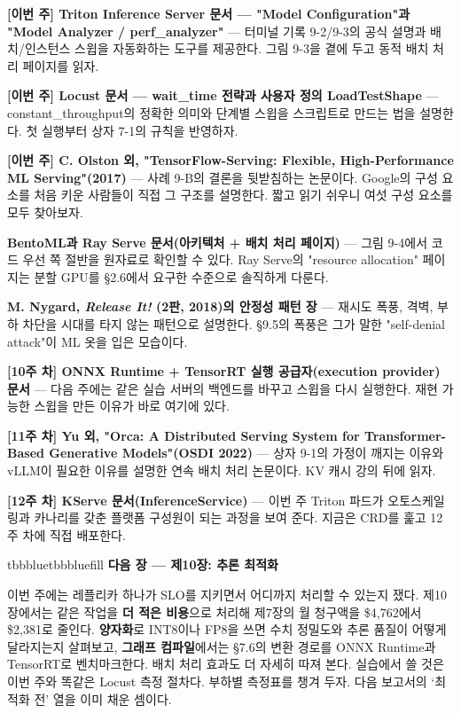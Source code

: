 \begin{tbbitemize}
  \item \textbf{[이번 주] Triton Inference Server 문서 — "Model Configuration"과 "Model Analyzer / perf\_analyzer"} — 터미널 기록 9-2/9-3의 공식 설명과 배치/인스턴스 스윕을 자동화하는 도구를 제공한다. 그림 9-3을 곁에 두고 동적 배치 처리 페이지를 읽자.
  \item \textbf{[이번 주] Locust 문서 — wait\_time 전략과 사용자 정의 LoadTestShape} — constant\_throughput의 정확한 의미와 단계별 스윕을 스크립트로 만드는 법을 설명한다. 첫 실행부터 상자 7-1의 규칙을 반영하자.
  \item \textbf{[이번 주] C. Olston 외, "TensorFlow-Serving: Flexible, High-Performance ML Serving"(2017)} — 사례 9-B의 결론을 뒷받침하는 논문이다. Google의 구성 요소를 처음 키운 사람들이 직접 그 구조를 설명한다. 짧고 읽기 쉬우니 여섯 구성 요소를 모두 찾아보자.
  \item \textbf{BentoML과 Ray Serve 문서(아키텍처 + 배치 처리 페이지)} — 그림 9-4에서 코드 우선 쪽 절반을 원자료로 확인할 수 있다. Ray Serve의 "resource allocation" 페이지는 분할 GPU를 §2.6에서 요구한 수준으로 솔직하게 다룬다.
  \item \textbf{M. Nygard, \textit{Release It!} (2판, 2018)의 안정성 패턴 장} — 재시도 폭풍, 격벽, 부하 차단을 시대를 타지 않는 패턴으로 설명한다. §9.5의 폭풍은 그가 말한 "self-denial attack"이 ML 옷을 입은 모습이다.
  \item \textbf{[10주 차] ONNX Runtime + TensorRT 실행 공급자(execution provider) 문서} — 다음 주에는 같은 실습 서버의 백엔드를 바꾸고 스윕을 다시 실행한다. 재현 가능한 스윕을 만든 이유가 바로 여기에 있다.
  \item \textbf{[11주 차] Yu 외, "Orca: A Distributed Serving System for Transformer-Based Generative Models"(OSDI 2022)} — 상자 9-1의 가정이 깨지는 이유와 vLLM이 필요한 이유를 설명한 연속 배치 처리 논문이다. KV 캐시 강의 뒤에 읽자.
  \item \textbf{[12주 차] KServe 문서(InferenceService)} — 이번 주 Triton 파드가 오토스케일링과 카나리를 갖춘 플랫폼 구성원이 되는 과정을 보여 준다. 지금은 CRD를 훑고 12주 차에 직접 배포한다.
\end{tbbitemize}

\vspace{5.0pt}

\begin{calloutbox}{tbbblue}{tbbbluefill}
{\normalsize\bfseries\color{tbbblue}다음 장 — 제10장: 추론 최적화}\par\vspace{3pt}
이번 주에는 레플리카 하나가 SLO를 지키면서 어디까지 처리할 수 있는지 쟀다. 제10장에서는 같은 작업을 \textbf{더 적은 비용}으로 처리해 제7장의 월 청구액을 \$4,762에서 \$2,381로 줄인다. \textbf{양자화}로 INT8이나 FP8을 쓰면 수치 정밀도와 추론 품질이 어떻게 달라지는지 살펴보고, \textbf{그래프 컴파일}에서는 §7.6의 변환 경로를 ONNX Runtime과 TensorRT로 벤치마크한다. 배치 처리 효과도 더 자세히 따져 본다. 실습에서 쓸 것은 이번 주와 똑같은 Locust 측정 절차다. 부하별 측정표를 챙겨 두자. 다음 보고서의 ‘최적화 전’ 열을 이미 채운 셈이다.
\end{calloutbox}
